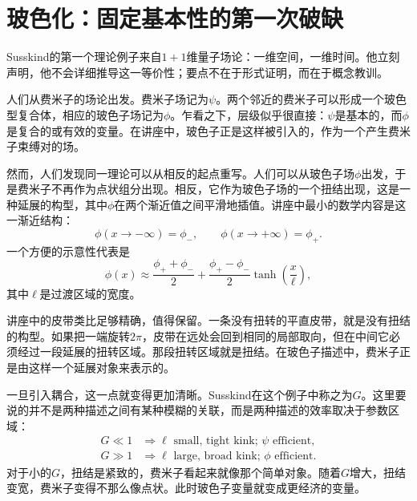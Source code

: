 \section{玻色化：固定基本性的第一次破缺}

Susskind的第一个理论例子来自\(1+1\)维量子场论：一维空间，一维时间。他立刻声明，他不会详细推导这一等价性；要点不在于形式证明，而在于概念教训。

人们从费米子的场论出发。费米子场记为\(\psi\)。两个邻近的费米子可以形成一个玻色型复合体，相应的玻色子场记为\(\phi\)。乍看之下，层级似乎很直接：\(\psi\)是基本的，而\(\phi\)是复合的或有效的变量。在讲座中，玻色子正是这样被引入的，作为一个产生费米子束缚对的场。

然而，人们发现同一理论可以从相反的起点重写。人们可以从玻色子场\(\phi\)出发，于是费米子不再作为点状组分出现。相反，它作为玻色子场的一个扭结出现，这是一种延展的构型，其中\(\phi\)在两个渐近值之间平滑地插值。讲座中最小的数学内容是这一渐近结构：
\begin{equation}
\phi(x\to -\infty)=\phi_-,
\qquad
\phi(x\to +\infty)=\phi_+.
\end{equation}
一个方便的示意性代表是
\begin{equation}
\phi(x)\approx \frac{\phi_++\phi_-}{2}
+
\frac{\phi_+-\phi_-}{2}\tanh\!\left(\frac{x}{\ell}\right),
\end{equation}
其中\(\ell\)是过渡区域的宽度。


讲座中的皮带类比足够精确，值得保留。一条没有扭转的平直皮带，就是没有扭结的构型。如果把一端旋转\(2\pi\)，皮带在远处会回到相同的局部取向，但在中间它必须经过一段延展的扭转区域。那段扭转区域就是扭结。在玻色子描述中，费米子正是由这样一个延展对象来表示的。

一旦引入耦合，这一点就变得更加清晰。Susskind在这个例子中称之为\(G\)。这里要说的并不是两种描述之间有某种模糊的关联，而是两种描述的效率取决于参数区域：
\begin{align}
G \ll 1
&\Rightarrow
\ell\text{ small, tight kink; }\psi\text{ efficient},\\
G \gg 1
&\Rightarrow
\ell\text{ large, broad kink; }\phi\text{ efficient}.
\end{align}
对于小的\(G\)，扭结是紧致的，费米子看起来就像那个简单对象。随着\(G\)增大，扭结变宽，费米子变得不那么像点状。此时玻色子变量就变成更经济的变量。


